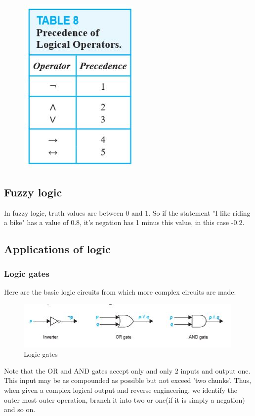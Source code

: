 \documentclass{article}
\theoremstyle{definition}
\begin{document}
\begin{figure}[h]
    \centering
    \includegraphics{figures/precedence}
\end{figure}

\subsection{Fuzzy logic}

In fuzzy logic, truth values are between 0 and 1. So if the statement "I like riding a bike" has a value of 0.8, it's negation has 1 minus this value, in this case -0.2. 

\subsection{Applications of logic}
\subsubsection{Logic gates}
Here are the basic logic circuits from which more complex circuits are made: 

\begin{figure}[h]
    \centering
    \includegraphics[scale= 1]{epflSemesterOne/advancedComputation/figures/logicgates.JPG}
    \caption{Logic gates}
    \label{fig:my_label}
\end{figure}

Note that the OR and AND gates accept only and only 2 inputs and output one. This input may be as compounded as possible but not exceed 'two chunks'. Thus, when given a complex logical output and reverse engineering, we identify the outer most outer operation, branch it into two or one(if it is simply a negation) and so on. 
\end{document}
